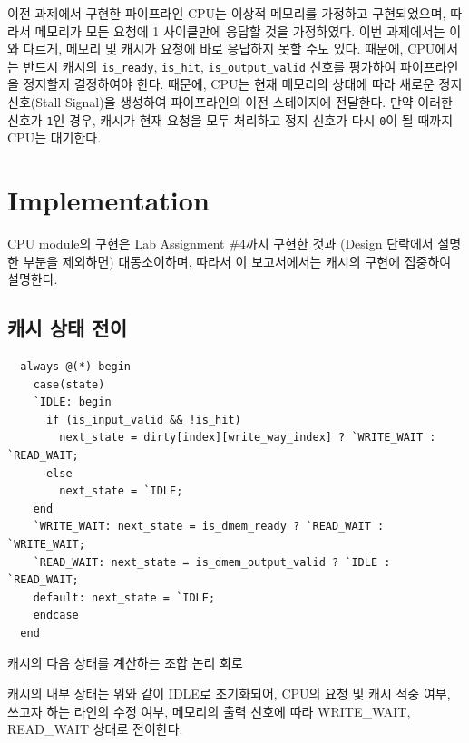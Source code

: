 \documentclass[openright, a4paper]{article}
\newcommand{\code}[1]{\texttt{#1}}
\newenvironment{longlisting}{\captionsetup{type=listing}}{}
\begin{document}
\hfill

이전 과제에서 구현한 파이프라인 CPU는 이상적 메모리를 가정하고 구현되었으며,
따라서 메모리가 모든 요청에 1 사이클만에 응답할 것을 가정하였다. 이번 과제에서는
이와 다르게, 메모리 및 캐시가 요청에 바로 응답하지 못할 수도 있다. 때문에, 
CPU에서는 반드시 캐시의 \code{is_ready}, \code{is_hit}, \code{is_output_valid}
신호를 평가하여 파이프라인을 정지할지 결정하여야 한다. 때문에, CPU는 현재
메모리의 상태에 따라 새로운 정지 신호(Stall Signal)을 생성하여 파이프라인의 이전
스테이지에 전달한다. 만약 이러한 신호가 \code{1}인 경우, 캐시가 현재 요청을 모두
처리하고 정지 신호가 다시 \code{0}이 될 때까지 CPU는 대기한다.

\hfill


\section{Implementation}

CPU module의 구현은 Lab Assignment \#4까지 구현한 것과 (Design 단락에서 설명한 
부분을 제외하면) 대동소이하며, 따라서 이 보고서에서는 캐시의 구현에 집중하여
설명한다.

\subsection{캐시 상태 전이}

\hfill

\begin{longlisting}
    \begin{verbatim}
  always @(*) begin
    case(state)
    `IDLE: begin
      if (is_input_valid && !is_hit)
        next_state = dirty[index][write_way_index] ? `WRITE_WAIT : `READ_WAIT;
      else
        next_state = `IDLE;
    end
    `WRITE_WAIT: next_state = is_dmem_ready ? `READ_WAIT : `WRITE_WAIT;
    `READ_WAIT: next_state = is_dmem_output_valid ? `IDLE : `READ_WAIT;
    default: next_state = `IDLE;
    endcase
  end
    \end{verbatim}
    \caption{캐시의 다음 상태를 계산하는 조합 논리 회로}
\end{longlisting}

\hfill

캐시의 내부 상태는 위와 같이 IDLE로 초기화되어, CPU의 요청 및 캐시 적중 
여부, 쓰고자 하는 라인의 수정 여부, 메모리의 출력 신호에 따라 WRITE_WAIT,
READ_WAIT 상태로 전이한다.  
\end{document}
